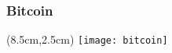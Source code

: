 \begin{frame}
 \frametitle{Bitcoin}
 
 
 \begin{textblock*}{5cm}(8.5cm,2.5cm)
  \texttt{[image: bitcoin]}
 \end{textblock*}
 
\end{frame}
